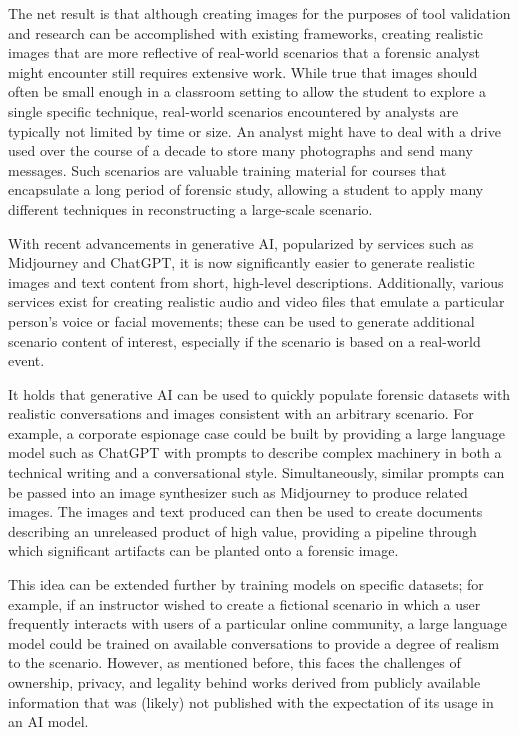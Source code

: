 The net result is that although creating images for the purposes of tool
validation and research can be accomplished with existing frameworks,
creating realistic images that are more reflective of real-world
scenarios that a forensic analyst might encounter still requires
extensive work. While true that images should often be small enough in a
classroom setting to allow the student to explore a single specific
technique, real-world scenarios encountered by analysts are typically
not limited by time or size. An analyst might have to deal with a drive
used over the course of a decade to store many photographs and send many
messages. Such scenarios are valuable training material for courses that
encapsulate a long period of forensic study, allowing a student to apply
many different techniques in reconstructing a large-scale scenario.

With recent advancements in generative AI, popularized by services such
as Midjourney and ChatGPT, it is now significantly easier to generate
realistic images and text content from short, high-level descriptions.
Additionally, various services exist for creating realistic audio and
video files that emulate a particular person's voice or facial
movements; these can be used to generate additional scenario content of
interest, especially if the scenario is based on a real-world event.

It holds that generative AI can be used to quickly populate forensic
datasets with realistic conversations and images consistent with an
arbitrary scenario. For example, a corporate espionage case could be
built by providing a large language model such as ChatGPT with prompts
to describe complex machinery in both a technical writing and a
conversational style. Simultaneously, similar prompts can be passed into
an image synthesizer such as Midjourney to produce related images. The
images and text produced can then be used to create documents describing
an unreleased product of high value, providing a pipeline through which
significant artifacts can be planted onto a forensic image.

This idea can be extended further by training models on specific
datasets; for example, if an instructor wished to create a fictional
scenario in which a user frequently interacts with users of a particular
online community, a large language model could be trained on available
conversations to provide a degree of realism to the scenario. However,
as mentioned before, this faces the challenges of ownership, privacy,
and legality behind works derived from publicly available information
that was (likely) not published with the expectation of its usage in an
AI model.

